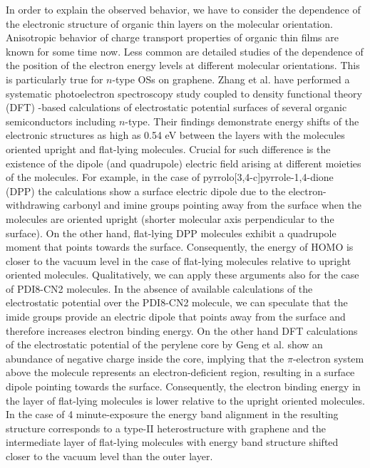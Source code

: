 \documentclass[review]{elsarticle}
\begin{document}
In order to explain the observed behavior, we have to consider the dependence of the electronic structure of organic thin layers on the molecular orientation.
  Anisotropic behavior of charge transport properties of organic thin films are known for some time now\cite{sundar-2004}.
 Less common are detailed studies of the dependence of the position of the electron energy levels at different molecular orientations.
 This is particularly true for $n$-type OSs on graphene.
 Zhang et al.
\cite{zhang-2016d} have performed a systematic photoelectron spectroscopy study coupled to density functional theory (DFT) -based calculations of electrostatic potential surfaces of several organic semiconductors including $n$-type.
 Their findings demonstrate energy shifts of the electronic structures as high as 0.54 eV between the layers with the molecules oriented upright and flat-lying molecules.
  Crucial for such difference is the existence of the dipole (and quadrupole) electric field arising at different moieties of the molecules.
 For example, in the case of pyrrolo[3,4-c]pyrrole-1,4-dione (DPP)  the calculations show a surface electric dipole due to the electron-withdrawing carbonyl and imine groups pointing  away from the surface when the molecules are oriented upright (shorter molecular axis perpendicular to the surface).
 On the other hand, flat-lying DPP molecules exhibit a quadrupole moment that points towards the surface.
 Consequently, the energy of HOMO is closer to the vacuum level in the case of flat-lying molecules relative to upright oriented molecules.
Qualitatively, we can apply these arguments also for the case of PDI8-CN2 molecules.
 In the absence of available calculations of the electrostatic potential over the PDI8-CN2 molecule, we can speculate that the imide groups provide an electric dipole that points away from the surface and therefore increases electron binding energy.
 On the other hand DFT calculations of the electrostatic potential of the perylene core by Geng et al.
\cite{geng-2012} show an abundance of negative charge inside the core, implying  that the $\pi$-electron system above the molecule represents an electron-deficient region, resulting in a surface dipole pointing towards the surface.
 Consequently, the electron binding energy in the layer of flat-lying molecules is lower relative to the upright oriented molecules.
  In the case of 4 minute-exposure the energy band alignment in the resulting structure corresponds to a type-II heterostructure with graphene and the intermediate layer of flat-lying molecules with energy band structure shifted closer to the vacuum level than the outer layer.
\end{document}
